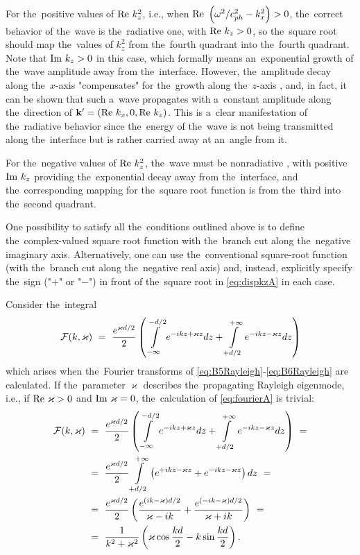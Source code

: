 For the~positive values of $\textrm{Re } k_z^2$, i.e., when $\textrm{Re }\left(\omega^2/c_{ph}^2-k_x^2\right) > 0$, the~correct behavior of the~wave is the~radiative one, with $\textrm{Re } k_z > 0$, so the~square root should map the~values of $k_z^2$ from the~fourth quadrant into the~fourth quadrant.
Note that $\textrm{Im } k_z > 0$ in this case, which formally means an~exponential growth of the~wave amplitude away from the~interface.
However, the~amplitude decay along the~$x$-axis "compensates" for the~growth along the~$z$-axis \cite{maradudin1,ingerbrigsten,lim}, and, in fact, it can be shown that such a~wave propagates with a~constant amplitude along the~direction of $\mathbf{k'} = (\textrm{Re } k_x,0,\textrm{Re } k_z)$.
This is a~clear manifestation of the~radiative behavior since the~energy of the~wave is not being transmitted along the~interface but is rather carried away at an~angle from it.

For the~negative values of $\textrm{Re } k_z^2$, the~wave must be nonradiative \cite{maradudin2,maradudin3}, with positive $\textrm{Im } k_z$ providing the~exponential decay away from the~interface, and the~corresponding mapping for the~square root function is from the~third into the~second quadrant.

One possibility to satisfy all the~conditions outlined above is to define the~complex-valued square root function with the~branch cut along the~negative imaginary axis.
%
Alternatively, one can use the~conventional square-root function (with the~branch cut along the~negative real axis) and, instead, explicitly specify the~sign ("$+$" or "$-$") in front of the~square root in \cref{eq:dispkzA} in each case.



\label{appRayleigh}

Consider the~integral
\begin{equation}
\label{eq:fourierA}
{\mathcal F}(k, \varkappa)~=~\frac{e^{\varkappa d/2}}{2}\left(\int\limits_{-\infty}^{-d/2}e^{-ikz+\varkappa z}dz + \int\limits_{+d/2}^{+\infty}e^{-ikz-\varkappa z}dz\right)
\end{equation}
which arises when the~Fourier transforms of \cref{eq:B5Rayleigh}-\cref{eq:B6Rayleigh} are calculated.
If the~parameter $\varkappa$ describes the~propagating Rayleigh eigenmode, i.e., if $\textrm{Re } \varkappa > 0$ and $\textrm{Im } \varkappa = 0$, the~calculation of \cref{eq:fourierA} is trivial:
\begin{align}
{\mathcal F}(k, \varkappa)~&=~\frac{e^{\varkappa d/2}}{2}\left(\int\limits_{-\infty}^{-d/2}e^{-ikz+\varkappa z}dz + \int\limits_{+d/2}^{+\infty}e^{-ikz-\varkappa z}dz\right)~=\\
&=~\frac{e^{\varkappa d/2}}{2}\int\limits_{+d/2}^{+\infty}\left(e^{+ikz-\varkappa z}+e^{-ikz-\varkappa z}\right)dz~= \notag\\
&=~\frac{e^{\varkappa d/2}}{2}\left(\frac{e^{(ik-\varkappa)d/2}}{\varkappa-ik}+\frac{e^{(-ik-\varkappa)d/2}}{\varkappa+ik}\right)~= \notag\\
&=~\frac{1}{k^2+\varkappa^2}\left(\varkappa \cos\frac{kd}{2}-k\sin\frac{kd}{2}\right). \notag
\end{align}

